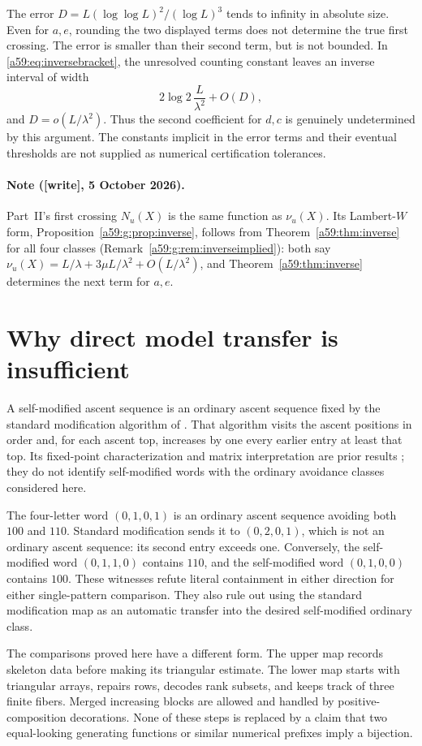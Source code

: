 \documentclass[11pt,letterpaper]{article}
\theoremstyle{remark}\newtheorem{remark}[theorem]{Remark}
\newcommand{\wtag}{\textup{[write]}}
\theoremstyle{remark}\newtheorem{wremark}{Remark}\renewcommand{\thewremark}{W\arabic{wremark}}
\theoremstyle{plain}\newtheorem{wcorollary}[wremark]{Corollary}
\begin{document}
The error $D=L(\log\log L)^2/(\log L)^3$ tends to infinity in absolute size. Even for $a,e$, rounding the two displayed terms does not determine the true first crossing. The error is smaller than their second term, but is not bounded. In \eqref{a59:eq:inversebracket}, the unresolved counting constant leaves an inverse interval of width
\[
 2\log2\,\frac L{\lambda^2}+O(D),
\]
and $D=o(L/\lambda^2)$. Thus the second coefficient for $d,c$ is genuinely undetermined by this argument. The constants implicit in the error terms and their eventual thresholds are not supplied as numerical certification tolerances.

\paragraph{Note (\wtag, 5 October 2026).} Part~II's first crossing $N_u(X)$
is the same function as $\nu_u(X)$. Its Lambert-$W$ form,
Proposition~\ref{a59:g:prop:inverse}, follows from
Theorem~\ref{a59:thm:inverse} for all four classes
(Remark~\ref{a59:g:rem:inverseimplied}): both say
$\nu_u(X)=L/\lambda+3\mu L/\lambda^2+O(L/\lambda^2)$, and
Theorem~\ref{a59:thm:inverse} determines the next term for $a,e$.
\section{Why direct model transfer is insufficient}\label{a59:sec:scope}
A self-modified ascent sequence is an ordinary ascent sequence fixed by the standard modification algorithm of \cite[Section~4.1]{bcdk}. That algorithm visits the ascent positions in order and, for each ascent top, increases by one every earlier entry at least that top. Its fixed-point characterization and matrix interpretation are prior results \cite{bcdk,dukes}; they do not identify self-modified words with the ordinary avoidance classes considered here.

The four-letter word $(0,1,0,1)$ is an ordinary ascent sequence avoiding both $100$ and $110$. Standard modification sends it to $(0,2,0,1)$, which is not an ordinary ascent sequence: its second entry exceeds one. Conversely, the self-modified word $(0,1,1,0)$ contains $110$, and the self-modified word $(0,1,0,0)$ contains $100$. These witnesses refute literal containment in either direction for either single-pattern comparison. They also rule out using the standard modification map as an automatic transfer into the desired self-modified ordinary class.

The comparisons proved here have a different form. The upper map records skeleton data before making its triangular estimate. The lower map starts with triangular arrays, repairs rows, decodes rank subsets, and keeps track of three finite fibers. Merged increasing blocks are allowed and handled by positive-composition decorations. None of these steps is replaced by a claim that two equal-looking generating functions or similar numerical prefixes imply a bijection.
\end{document}
